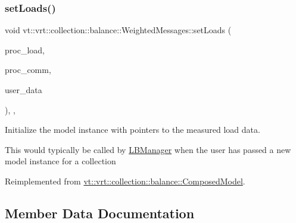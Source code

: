 \subsubsection{\texorpdfstring{set\+Loads()}{setLoads()}}
{\footnotesize\ttfamily void vt\+::vrt\+::collection\+::balance\+::\+Weighted\+Messages\+::set\+Loads (\begin{DoxyParamCaption}\item[{std\+::unordered\+\_\+map$<$ \hyperlink{namespacevt_a46ce6733d5cdbd735d561b7b4029f6d7}{Phase\+Type}, \hyperlink{namespacevt_1_1vrt_1_1collection_1_1balance_a5339303db2e1ce964d783a53fd74e6b1}{Load\+Map\+Type} $>$ const $\ast$}]{proc\+\_\+load,  }\item[{std\+::unordered\+\_\+map$<$ \hyperlink{namespacevt_a46ce6733d5cdbd735d561b7b4029f6d7}{Phase\+Type}, \hyperlink{namespacevt_1_1vrt_1_1collection_1_1balance_a01ee1fb0ae2da1d2ab7fdca3be9ae351}{Comm\+Map\+Type} $>$ const $\ast$}]{proc\+\_\+comm,  }\item[{std\+::unordered\+\_\+map$<$ \hyperlink{namespacevt_a46ce6733d5cdbd735d561b7b4029f6d7}{Phase\+Type}, \hyperlink{namespacevt_1_1vrt_1_1collection_1_1balance_acf152c668ed9e2e9c6b29784181d2435}{Data\+Map\+Type} $>$ const $\ast$}]{user\+\_\+data }\end{DoxyParamCaption})\hspace{0.3cm}{\ttfamily [inline]}, {\ttfamily [override]}, {\ttfamily [virtual]}}



Initialize the model instance with pointers to the measured load data. 

This would typically be called by \hyperlink{structvt_1_1vrt_1_1collection_1_1balance_1_1_l_b_manager}{L\+B\+Manager} when the user has passed a new model instance for a collection 

Reimplemented from \hyperlink{classvt_1_1vrt_1_1collection_1_1balance_1_1_composed_model_a0c4e07b352c1e8cbb8383d26361437e5}{vt\+::vrt\+::collection\+::balance\+::\+Composed\+Model}.



\subsection{Member Data Documentation}
\mbox{\label{structvt_1_1vrt_1_1collection_1_1balance_1_1_weighted_messages_a23b15544d4d51fa8613dad5727c52732}} 
